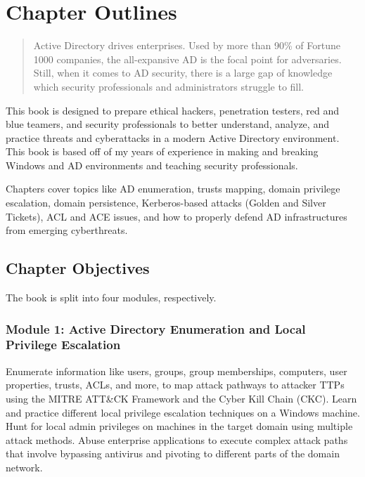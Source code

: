 %
%
%
\chapter{Chapter Outlines}
\label{intro} %

\begin{abstract}
Active Directory drives enterprises. Used by more than 90\% of Fortune 1000 companies, the all-expansive AD is the focal point for adversaries. Still, when it comes to AD security, there is a large gap of knowledge which security professionals and administrators struggle to fill.
\end{abstract}
This book is designed to prepare ethical hackers, penetration testers, red and blue teamers, and security professionals to better understand, analyze, and practice threats and cyberattacks in a modern Active Directory environment. This book is based off of my years of experience in making and breaking Windows and AD environments and teaching security professionals.

Chapters cover topics like AD enumeration, trusts mapping, domain privilege escalation, domain persistence, Kerberos-based attacks (Golden and Silver Tickets), ACL and ACE issues, and how to properly defend AD infrastructures from emerging cyberthreats.

\section{Chapter Objectives}
The book is split into four modules, respectively.

\subsection{Module 1: Active Directory Enumeration and Local Privilege Escalation}
Enumerate information like users, groups, group memberships, computers, user properties, trusts, ACLs, and more, to map attack pathways to attacker TTPs using the MITRE ATT\&CK Framework and the Cyber Kill Chain (CKC).
Learn and practice different local privilege escalation techniques on a Windows machine.
Hunt for local admin privileges on machines in the target domain using multiple attack methods.
Abuse enterprise applications to execute complex attack paths that involve bypassing antivirus and pivoting to different parts of the domain network.

